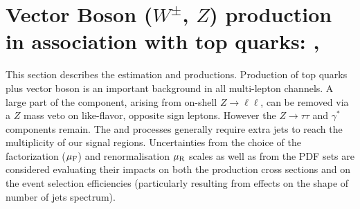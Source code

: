 \begin{table}
{
\label{table:background_summary}
}
\end{table} 


\section{Vector Boson ($W^{\pm}$, $Z$) production in association with top quarks: \ttV, \tZ}  
\label{section:ttV}
This section describes the estimation  and \ttV productions. 
Production of top quarks plus vector boson is an important background in all multi-lepton channels.   A large part of the \ttV component, arising from on-shell $Z\to\ell\ell$, can be removed via a $Z$ mass veto on like-flavor, opposite sign leptons.  However the $Z \to \tau\tau$ and $\gamma^*$ components remain. The \ttW and \tZ processes generally require extra jets to reach the multiplicity of our signal regions.  Uncertainties from the choice of the factorization ($\mu_{\rm F}$) and renormalisation $\mu_{\rm R}$ scales as well as from the PDF sets are considered evaluating their impacts on both the production cross sections and on the event selection efficiencies (particularly resulting from effects on the shape of number of jets spectrum). 

